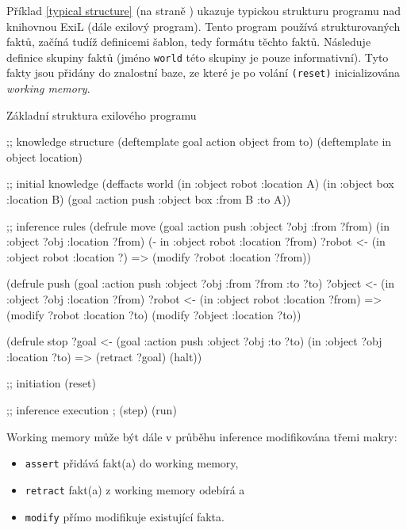 
Příklad \ref{typical structure} (na straně \pageref{typical structure}) ukazuje
typickou strukturu programu nad knihovnou ExiL (dále exilový program). Tento
program používá strukturovaných faktů, začíná tudíž definicemi šablon, tedy
formátu těchto faktů. Následuje definice skupiny faktů (jméno \verb|world| této
skupiny je pouze informativní). Tyto fakty jsou přidány do znalostní baze, ze
které je po volání \verb|(reset)| inicializována \emph{working memory}.

\begin{listing}[H]
\caption{Základní struktura exilového programu}
\label{typical structure}
\begin{clcode}
;; knowledge structure
(deftemplate goal action object from to)
(deftemplate in object location)

;; initial knowledge
(deffacts world
  (in :object robot :location A)
  (in :object box :location B)
  (goal :action push :object box :from B :to A))

;; inference rules
(defrule move
  (goal :action push :object ?obj :from ?from)
  (in :object ?obj :location ?from)
  (- in :object robot :location ?from)
  ?robot <- (in :object robot :location ?)
  =>
  (modify ?robot :location ?from))

(defrule push
  (goal :action push :object ?obj :from ?from :to ?to)
  ?object <- (in :object ?obj :location ?from)
  ?robot <- (in :object robot :location ?from)
  =>
  (modify ?robot :location ?to)
  (modify ?object :location ?to))

(defrule stop
  ?goal <- (goal :action push :object ?obj :to ?to)
  (in :object ?obj :location ?to)
  =>
  (retract ?goal)
  (halt))

;; initiation
(reset)

;; inference execution
; (step)
(run)
\end{clcode}
\end{listing}

Working memory může být dále v průběhu inference modifikována třemi makry:
\begin{itemize}
  \item \verb|assert| přidává fakt(a) do working memory,
  \item \verb|retract| fakt(a) z working memory odebírá a
  \item \verb|modify| přímo modifikuje existující fakta.
\end{itemize}

